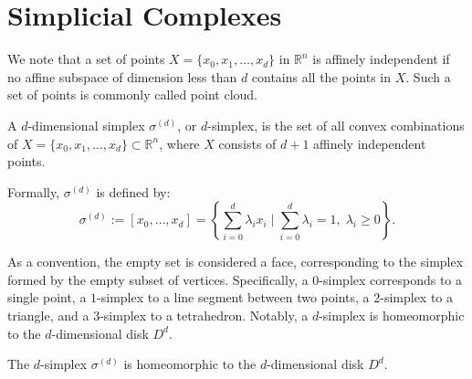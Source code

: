 \section{Simplicial Complexes}
\label{Simplicial Complexes} We note that a set of points
$X = \{x_{0}, x_{1}, \ldots, x_{d}\}$ in $\mathbb{R}^{n}$ is affinely
independent if no affine subspace
of dimension less than $d$ contains all the points in $X$. Such a set of points is
commonly called point cloud.

\begin{definition}[$d$-simplex]{\cite[Definition 2.1]{boissonnat2018geometric}}
	\label{d-simplex} A $d$-dimensional
	simplex $\sigma^{(d)}$, or $d$-simplex, is the set of all convex combinations
	of $X = \{x_{0}, x_{1}, \ldots, x_{d}\} \subset \mathbb{R}^{n}$, where
	$X$ consists of $d+1$ affinely independent points.
						
	Formally, $\sigma^{(d)}$ is
	defined by:
	\begin{equation}
		\sigma^{(d)}:= [x_0, \ldots, x_d] = \left\{\sum_{i=0}^{d}\lambda_{i} x_{i} \; \bigg\vert \; \sum_{i=0}^{d}\lambda
		_{i} = 1, \; \lambda_{i} \geq 0\right\}.
	\end{equation}
\end{definition}

As a convention, the empty set is considered a face, corresponding
to the simplex formed by the empty subset of vertices. Specifically, a $0$-simplex
corresponds to a single point, a $1$-simplex to a line segment between two
points, a $2$-simplex to a triangle, and a $3$-simplex to a tetrahedron. Notably,
a $d$-simplex is homeomorphic to the $d$-dimensional disk $D^{d}$.

\begin{lemma}
	The $d$-simplex $\sigma^{(d)}$ is homeomorphic to the $d$-dimensional disk $D^{d}$.
\end{lemma}

